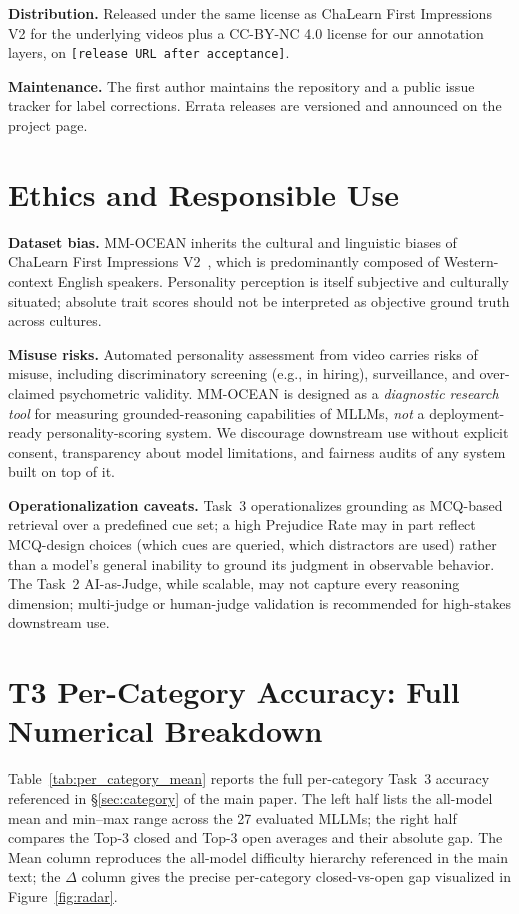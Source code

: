 \documentclass{article}
\newcommand{\benchname}{MM-OCEAN}
\begin{document}
\noindent\textbf{Distribution.} Released under the same license as ChaLearn First Impressions V2 for the underlying videos plus a CC-BY-NC 4.0 license for our annotation layers, on \texttt{[release URL after acceptance]}.

\noindent\textbf{Maintenance.} The first author maintains the repository and a public issue tracker for label corrections. Errata releases are versioned and announced on the project page.

\section{Ethics and Responsible Use}
\label{app:ethics}

\noindent\textbf{Dataset bias.} \benchname{} inherits the cultural and linguistic biases of ChaLearn First Impressions V2~\cite{escalante2020modeling}, which is predominantly composed of Western-context English speakers. Personality perception is itself subjective and culturally situated; absolute trait scores should not be interpreted as objective ground truth across cultures.

\noindent\textbf{Misuse risks.} Automated personality assessment from video carries risks of misuse, including discriminatory screening (e.g., in hiring), surveillance, and over-claimed psychometric validity. \benchname{} is designed as a \emph{diagnostic research tool} for measuring grounded-reasoning capabilities of MLLMs, \emph{not} a deployment-ready personality-scoring system. We discourage downstream use without explicit consent, transparency about model limitations, and fairness audits of any system built on top of it.

\noindent\textbf{Operationalization caveats.} Task~3 operationalizes grounding as MCQ-based retrieval over a predefined cue set; a high Prejudice Rate may in part reflect MCQ-design choices (which cues are queried, which distractors are used) rather than a model's general inability to ground its judgment in observable behavior. The Task~2 AI-as-Judge, while scalable, may not capture every reasoning dimension; multi-judge or human-judge validation is recommended for high-stakes downstream use.

\section{T3 Per-Category Accuracy: Full Numerical Breakdown}
\label{app:per_category}

Table~\ref{tab:per_category_mean} reports the full per-category Task~3 accuracy referenced in \S\ref{sec:category} of the main paper. The left half lists the all-model mean and min--max range across the 27 evaluated MLLMs; the right half compares the Top-3 closed and Top-3 open averages and their absolute gap. The Mean column reproduces the all-model difficulty hierarchy referenced in the main text; the $\Delta$ column gives the precise per-category closed-vs-open gap visualized in Figure~\ref{fig:radar}.
\end{document}
